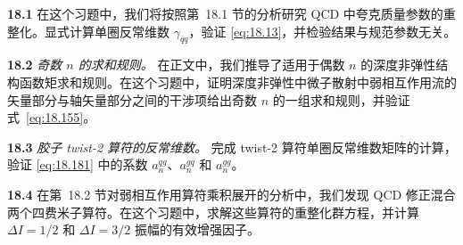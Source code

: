 \problems

\textbf{18.1} 在这个习题中，我们将按照第~18.1 节的分析研究 QCD 中夸克质量参数的重整化。显式计算单圈反常维数 $\gamma_{\bar{q}q}$，验证 \eqref{eq:18.13}，并检验结果与规范参数无关。

\textbf{18.2} \emph{奇数 $n$ 的求和规则。} 在正文中，我们推导了适用于偶数 $n$ 的深度非弹性结构函数矩求和规则。在这个习题中，证明深度非弹性中微子散射中弱相互作用流的矢量部分与轴矢量部分之间的干涉项给出奇数 $n$ 的一组求和规则，并验证式~\eqref{eq:18.155}。

\textbf{18.3} \emph{胶子 twist-2 算符的反常维数。} 完成 twist-2 算符单圈反常维数矩阵的计算，验证 \eqref{eq:18.181} 中的系数 $a_n^{qg}$、$a_n^{gq}$ 和 $a_n^{gg}$。

\textbf{18.4} 在第~18.2 节对弱相互作用算符乘积展开的分析中，我们发现 QCD 修正混合两个四费米子算符。在这个习题中，求解这些算符的重整化群方程，并计算 $\Delta I = 1/2$ 和 $\Delta I = 3/2$ 振幅的有效增强因子。
